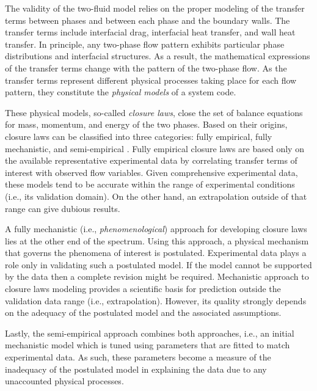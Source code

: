 The validity of the two-fluid model relies on the proper modeling of the transfer terms between phases and between each phase and the boundary walls.
The transfer terms include interfacial drag, interfacial heat transfer, and wall heat transfer.
In principle, any two-phase flow pattern exhibits particular phase distributions and interfacial structures.
As a result, the mathematical expressions of the transfer terms change with the pattern of the two-phase flow.
As the transfer terms represent different physical processes taking place for each flow pattern, they constitute the \emph{physical models} of a system code.

These physical models, so-called \emph{closure laws}, close the set of balance equations for mass, momentum, and energy of the two phases.
Based on their origins, closure laws can be classified into three categories: fully empirical, fully mechanistic, and semi-empirical \cite{Bestion2008}.
Fully empirical closure laws are based only on the available representative experimental data by correlating transfer terms of interest with observed flow variables.
Given comprehensive experimental data, these models tend to be accurate within the range of experimental conditions (i.e., its validation domain).
On the other hand, an extrapolation outside of that range can give dubious results.

A fully mechanistic (i.e., \emph{phenomenological}) approach for developing closure laws lies at the other end of the spectrum.
Using this approach, a physical mechanism that governs the phenomena of interest is postulated.
Experimental data plays a role only in validating such a postulated model.
If the model cannot be supported by the data then a complete revision might be required.
Mechanistic approach to closure laws modeling provides a scientific basis for prediction outside the validation data range (i.e., extrapolation). 
However, its quality strongly depends on the adequacy of the postulated model and the associated assumptions.

Lastly, the semi-empirical approach combines both approaches, i.e., an initial mechanistic model which is tuned using parameters that are fitted to match experimental data.
As such, these parameters become a measure of the inadequacy of the postulated model in explaining the data due to any unaccounted physical processes.

